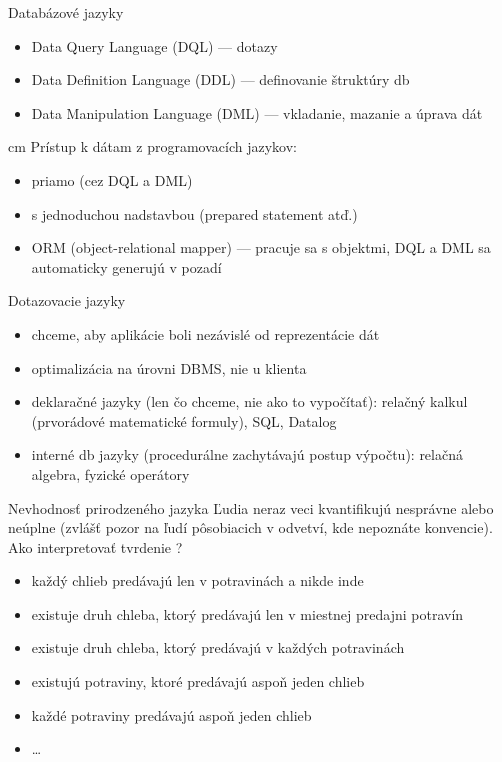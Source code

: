 \documentclass[12pt]{beamer}
\begin{document}
\begin{frame}{Databázové jazyky}
\begin{itemize}
\item Data Query Language (DQL) --- dotazy
\item Data Definition Language (DDL) --- definovanie štruktúry db
\item Data Manipulation Language (DML) --- vkladanie, mazanie a úprava dát
\end{itemize}
 cm
\pause
Prístup k dátam z programovacích jazykov:
\begin{itemize}
\item priamo (cez DQL a DML)
\item s jednoduchou nadstavbou (prepared statement atď.)
\item ORM (object-relational mapper) --- pracuje sa s objektmi, DQL a DML sa automaticky generujú v pozadí
\end{itemize}
\end{frame}

\begin{frame}{Dotazovacie jazyky}
\begin{itemize}
\item chceme, aby aplikácie boli nezávislé od reprezentácie dát
\item optimalizácia na úrovni DBMS, nie u klienta
\pause
\item deklaračné jazyky (len čo chceme, nie ako to vypočítať): relačný kalkul (prvorádové matematické formuly), SQL, Datalog
\pause
\item interné db jazyky (procedurálne zachytávajú postup výpočtu): relačná algebra, fyzické operátory
\end{itemize}
\end{frame}

\begin{frame}{Nevhodnosť prirodzeného jazyka}
Ľudia neraz veci kvantifikujú nesprávne alebo neúplne (zvlášť pozor na ľudí pôsobiacich v odvetví, kde nepoznáte konvencie).
Ako interpretovať tvrdenie ?
\pause
\begin{itemize}
\item každý chlieb predávajú len v potravinách a nikde inde
\item existuje druh chleba, ktorý predávajú len v miestnej predajni potravín
\item existuje druh chleba, ktorý predávajú v každých potravinách
\item existujú potraviny, ktoré predávajú aspoň jeden chlieb
\item každé potraviny predávajú aspoň jeden chlieb
\item \dots
\end{itemize}
\end{frame}
\end{document}
